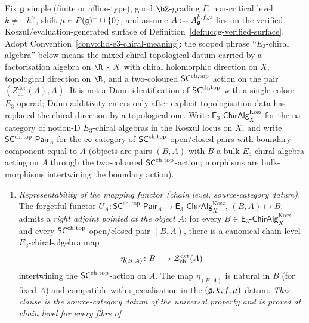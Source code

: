 \begin{proposition}
\label{prop:ucqg-chd-universal-property}
Fix $\mathfrak{g}$ simple (finite or affine-type), good $\bZ$-grading
$\Gamma$, non-critical level $k\neq -h^{\vee}$, shift
$\mu\in P(\mathfrak{g})^{+}\cup\{0\}$, and assume
$A := A_{\mathfrak{g}}^{k,f,\mu}$ lies on the verified
Koszul/evaluation-generated surface of
Definition~\ref{def:ucqg-verified-surface}. Adopt
Convention~\ref*{conv:chd-e3-chiral-meaning}: the scoped phrase
``$E_3$-chiral algebra'' below means the mixed chiral-topological
datum carried by a factorisation algebra on $\R\times X$ with chiral
holomorphic direction on $X$, topological direction on $\R$, and a
two-coloured $\mathsf{SC}^{\mathrm{ch},\mathrm{top}}$ action on the pair
$(Z^{\mathrm{der}}_{\mathrm{ch}}(A),A)$. It is not a Dunn
identification of $\mathsf{SC}^{\mathrm{ch},\mathrm{top}}$ with a single-colour $E_3$ operad; Dunn
additivity enters only after explicit topologisation data has replaced
the chiral direction by a topological one.
Write $\mathsf{E}_3\text{-}\mathsf{ChirAlg}_X^{\mathrm{Kosz}}$
for the $\infty$-category of notion-D $E_3$-chiral algebras in
the Koszul locus on $X$, and write
$\mathsf{SC}^{\mathrm{ch,top}}\text{-}\mathsf{Pair}_A$ for the
$\infty$-category of $\mathsf{SC}^{\mathrm{ch},\mathrm{top}}$-open/closed pairs with boundary
component equal to $A$ (objects are pairs $(B,A)$ with $B$ a
bulk $E_3$-chiral algebra acting on $A$ through the
two-coloured $\mathsf{SC}^{\mathrm{ch},\mathrm{top}}$-action; morphisms are bulk-morphisms
intertwining the boundary action).
\begin{enumerate}
\item[(a)] \emph{Representability of the mapping functor (chain
 level, source-category datum).} The forgetful functor
 $U_A\colon \mathsf{SC}^{\mathrm{ch,top}}\text{-}\mathsf{Pair}_A
 \to \mathsf{E}_3\text{-}\mathsf{ChirAlg}_X^{\mathrm{Kosz}}$,
 $(B,A)\mapsto B$, admits a \emph{right adjoint pointed at the
 object $A$}: for every
 $B\in\mathsf{E}_3\text{-}\mathsf{ChirAlg}_X^{\mathrm{Kosz}}$ and
 every $\mathsf{SC}^{\mathrm{ch},\mathrm{top}}$-open/closed pair $(B,A)$, there is a canonical
 chain-level $E_3$-chiral-algebra map
 \[
 \eta_{(B,A)}\colon B \longrightarrow
 \mathcal{Z}^{\mathrm{der}}_{\mathrm{ch}}(A)
 \]
 intertwining the $\mathsf{SC}^{\mathrm{ch},\mathrm{top}}$-action on $A$. The map
 $\eta_{(B,A)}$ is natural in $B$ (for fixed $A$) and compatible
 with specialisation in the $(\mathfrak{g}, k, f, \mu)$ datum. \emph{This
 clause is the source-category datum of the universal property
 and is proved at chain level for every fibre of
}
\end{enumerate}
\end{proposition}
